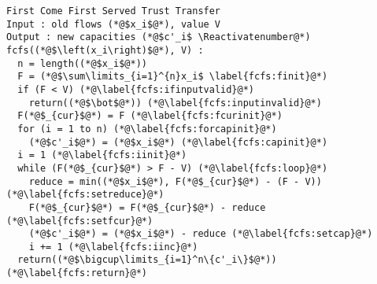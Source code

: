 \Suppressnumber
\begin{lstlisting}[label=fcfs, style=numbers]
First Come First Served Trust Transfer
Input : old flows (*@$x_i$@*), value V
Output : new capacities (*@$c'_i$ \Reactivatenumber@*)
fcfs((*@$\left(x_i\right)$@*), V) :
  n = length((*@$x_i$@*))
  F = (*@$\sum\limits_{i=1}^{n}x_i$ \label{fcfs:finit}@*)
  if (F < V) (*@\label{fcfs:ifinputvalid}@*)
    return((*@$\bot$@*)) (*@\label{fcfs:inputinvalid}@*)
  F(*@$_{cur}$@*) = F (*@\label{fcfs:fcurinit}@*)
  for (i = 1 to n) (*@\label{fcfs:forcapinit}@*)
    (*@$c'_i$@*) = (*@$x_i$@*) (*@\label{fcfs:capinit}@*)
  i = 1 (*@\label{fcfs:iinit}@*)
  while (F(*@$_{cur}$@*) > F - V) (*@\label{fcfs:loop}@*)
    reduce = min((*@$x_i$@*), F(*@$_{cur}$@*) - (F - V)) (*@\label{fcfs:setreduce}@*)
    F(*@$_{cur}$@*) = F(*@$_{cur}$@*) - reduce (*@\label{fcfs:setfcur}@*)
    (*@$c'_i$@*) = (*@$x_i$@*) - reduce (*@\label{fcfs:setcap}@*)
    i += 1 (*@\label{fcfs:iinc}@*)
  return((*@$\bigcup\limits_{i=1}^n\{c'_i\}$@*)) (*@\label{fcfs:return}@*)
\end{lstlisting}
